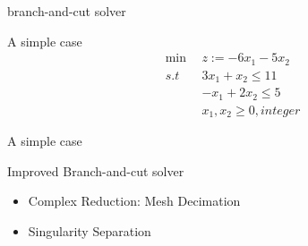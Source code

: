 \documentclass{beamer}
\begin{document}
\begin{frame}{branch-and-cut solver}
\begin{block}{A simple case}
\begin{eqnarray}
\min &z := −6x_1-5x_2\\
s.t\quad &3x_1+x_2\leq 11 \\
&-x_1+2x_2\leq 5 \\
&x_1,x_2 \geq 0, integer
\end{eqnarray}
\end{block}
\end{frame}

\begin{frame}{A simple case}
\end{frame}

\begin{frame}{Improved Branch-and-cut solver}
\begin{itemize}
\item Complex Reduction: Mesh Decimation
  
\item Singularity Separation
\end{itemize}
\end{frame}
\end{document}
